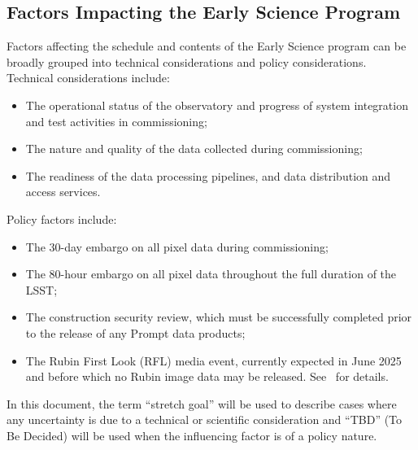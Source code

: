 \subsection{Factors Impacting the Early Science Program}
\label{ssec:impact}

Factors affecting the schedule and contents of the Early Science program can be broadly grouped into technical considerations and policy considerations. 
Technical considerations include:
\begin{itemize}
\item The operational status of the observatory and progress of system integration and test activities in commissioning; 
\item The nature and quality of the data collected during commissioning; 
\item The readiness of the data processing pipelines, and data distribution and access services. 
\end{itemize}
Policy factors include:
\begin{itemize}
\item The 30-day embargo on all pixel data during commissioning;
\item The 80-hour embargo on all pixel data throughout the full duration of the LSST; 
\item The  construction security review, which must be successfully completed prior to the release of any Prompt data products;
\item The Rubin First Look (RFL) media event, currently expected in June 2025 and before which  no Rubin image data may be released. See~ for details.
\end{itemize}
In this document, the term ``stretch goal'' will be used to describe cases where any uncertainty is due to a technical or scientific consideration and ``TBD'' (To Be Decided) will be used when the influencing factor is of a policy nature. 